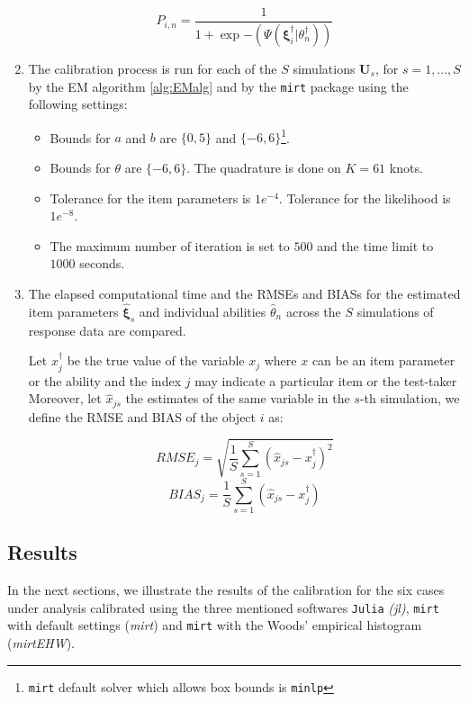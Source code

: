 \begin{enumerate}
	\[P_{i,n}=\frac{1}{1+\exp{-(\Psi(\boldsymbol{\xi}_i^\dagger|\theta_n^\dagger))}} \]
	
	\item The calibration process is run for each of the $S$ simulations $\mathbf{U}_s$, for $s=1,\ldots,S$ by the EM algorithm \ref{alg:EMalg} and by the \texttt{mirt} package using the following settings:
	\begin{itemize}
		\item Bounds for $a$ and $b$ are $\{0,5\}$ and $\{-6,6\}$\footnote{\texttt{mirt} default solver which allows box bounds is \texttt{minlp}}. 
		\item Bounds for $\theta$ are $\{-6,6\}$. The quadrature is done on $K=61$ knots.
		\item Tolerance for the item parameters is $1e^{-4}$. Tolerance for the likelihood is $1e^{-8}$.
		\item The maximum number of iteration is set to $500$ and the time limit to $1000$ seconds.
	\end{itemize}
	\item The elapsed computational time and the RMSEs and BIASs for the estimated item parameters $\hat{\boldsymbol{\xi}}_s$ and individual abilities $\hat{\theta}_n$ across the $S$ simulations of response data are compared.
	
	Let $x_j^\dagger$ be the true value of the variable $x_j$ where $x$ can be an item parameter or the ability and the index $j$ may indicate a particular item or the test-taker Moreover, let $\hat{x}_{js}$ the estimates of the same variable in the $s$-th simulation, we define the RMSE and BIAS of the object $i$ as:
	
	\begin{equation}
	RMSE_j=\sqrt{\frac{1}{S} \sum_{s=1}^S{\left( \hat{x}_{js}-x_j^\dagger \right)^2}}
	\end{equation}
	\begin{equation}
	BIAS_j=\frac{1}{S} \sum_{s=1}^S{\left( \hat{x}_{js}-x_j^\dagger \right)}
	\end{equation}
	
\end{enumerate}


\subsection{Results} 

In the next sections, we illustrate the results of the calibration for the six cases under analysis calibrated using the three mentioned softwares \texttt{Julia} \emph{(jl)}, \texttt{mirt} with default settings (\emph{mirt}) and \texttt{mirt} with the Woods' empirical histogram (\emph{mirtEHW}).

